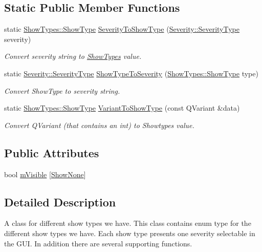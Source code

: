 \subsection*{Static Public Member Functions}
\begin{DoxyCompactItemize}
\item 
static \hyperlink{class_show_types_a92c368f2a33741268265ac2d931eae3f}{Show\-Types\-::\-Show\-Type} \hyperlink{class_show_types_a1a610cc3356a13ba6a61615877387fc1}{Severity\-To\-Show\-Type} (\hyperlink{class_severity_ac185938ae084355bbf1790cf1a70caa6}{Severity\-::\-Severity\-Type} severity)
\begin{DoxyCompactList}\small\item\em Convert severity string to \hyperlink{class_show_types}{Show\-Types} value. \end{DoxyCompactList}\item 
static \hyperlink{class_severity_ac185938ae084355bbf1790cf1a70caa6}{Severity\-::\-Severity\-Type} \hyperlink{class_show_types_ad4a54c1b7f85d098d1e3a244b5dafc0c}{Show\-Type\-To\-Severity} (\hyperlink{class_show_types_a92c368f2a33741268265ac2d931eae3f}{Show\-Types\-::\-Show\-Type} type)
\begin{DoxyCompactList}\small\item\em Convert Show\-Type to severity string. \end{DoxyCompactList}\item 
static \hyperlink{class_show_types_a92c368f2a33741268265ac2d931eae3f}{Show\-Types\-::\-Show\-Type} \hyperlink{class_show_types_a7d18f6bffb30d8ee3df53dbd5cfbeccf}{Variant\-To\-Show\-Type} (const Q\-Variant \&data)
\begin{DoxyCompactList}\small\item\em Convert Q\-Variant (that contains an int) to Showtypes value. \end{DoxyCompactList}\end{DoxyCompactItemize}
\subsection*{Public Attributes}
\begin{DoxyCompactItemize}
\item 
bool \hyperlink{class_show_types_a3e2bef2e4f0394d451ec638070fb73cd}{m\-Visible} \mbox{[}\hyperlink{class_show_types_a92c368f2a33741268265ac2d931eae3fade7d9bfa7206900801f2cf24376451a2}{Show\-None}\mbox{]}
\end{DoxyCompactItemize}


\subsection{Detailed Description}
A class for different show types we have. This class contains enum type for the different show types we have. Each show type presents one severity selectable in the G\-U\-I. In addition there are several supporting functions. 

